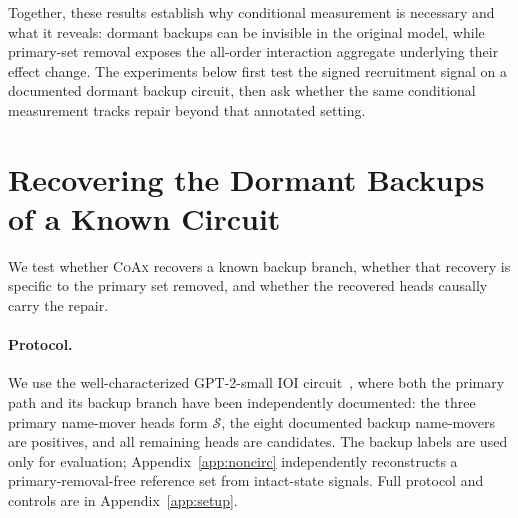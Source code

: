 \documentclass{article} %
\theoremstyle{plain}
\theoremstyle{definition}
\newcommand{\coax}{\textsc{CoAx}\xspace}
\newcommand{\Sset}{\mathcal{S}}
\newcommand{\primary}[1]{\textcolor{primarycolor}{#1}}
\newcommand{\backup}[1]{\textcolor{backupcolor}{#1}}
\begin{document}
Together, these results establish why conditional measurement is necessary and what it reveals: dormant backups can be invisible in the original model, while primary-set removal exposes the all-order interaction aggregate underlying their effect change.
The experiments below first test the signed recruitment signal on a documented dormant backup circuit, then ask whether the same conditional measurement tracks repair beyond that annotated setting.

\section{Recovering the Dormant Backups of a Known Circuit}
\label{sec:discovery}

We test whether \coax recovers a known backup branch, whether that recovery is specific to the primary set removed, and whether the recovered heads causally carry the repair.

\paragraph{Protocol.}
We use the well-characterized GPT-2-small IOI circuit~\citep{radford2019gpt2,wang2022ioi}, where both the \primary{primary} path and its \backup{backup} branch have been independently documented:
the three \primary{primary} name-mover heads form $\Sset$, the eight documented \backup{backup} name-movers are positives, and all remaining heads are candidates.
The backup labels are used only for evaluation; Appendix~\ref{app:noncirc} independently reconstructs a primary-removal-free reference set from intact-state signals.
Full protocol and controls are in Appendix~\ref{app:setup}.
\end{document}
